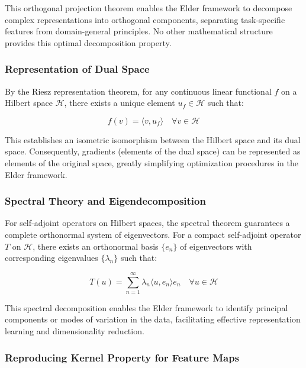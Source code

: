This orthogonal projection theorem enables the Elder framework to decompose complex representations into orthogonal components, separating task-specific features from domain-general principles. No other mathematical structure provides this optimal decomposition property.

\subsubsection{Representation of Dual Space}

By the Riesz representation theorem, for any continuous linear functional $f$ on a Hilbert space $\mathcal{H}$, there exists a unique element $u_f \in \mathcal{H}$ such that:

\begin{equation}
f(v) = \langle v, u_f \rangle \quad \forall v \in \mathcal{H}
\end{equation}

This establishes an isometric isomorphism between the Hilbert space and its dual space. Consequently, gradients (elements of the dual space) can be represented as elements of the original space, greatly simplifying optimization procedures in the Elder framework.

\subsubsection{Spectral Theory and Eigendecomposition}

For self-adjoint operators on Hilbert spaces, the spectral theorem guarantees a complete orthonormal system of eigenvectors. For a compact self-adjoint operator $T$ on $\mathcal{H}$, there exists an orthonormal basis $\{e_n\}$ of eigenvectors with corresponding eigenvalues $\{\lambda_n\}$ such that:

\begin{equation}
T(u) = \sum_{n=1}^{\infty} \lambda_n \langle u, e_n \rangle e_n \quad \forall u \in \mathcal{H}
\end{equation}

This spectral decomposition enables the Elder framework to identify principal components or modes of variation in the data, facilitating effective representation learning and dimensionality reduction.

\subsubsection{Reproducing Kernel Property for Feature Maps}

